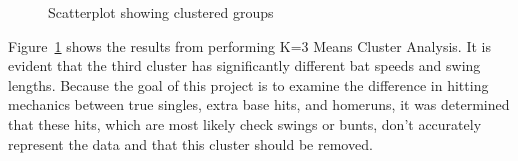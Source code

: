 \documentclass[
  letterpaper,
  DIV=11,
  numbers=noendperiod]{scrartcl}
\begin{document}
\begin{figure}[H]


\caption{\label{fig-cluster}Scatterplot showing clustered groups}

\end{figure}%

\begin{table}

\caption{\label{tbl-kmeanssum-variables}K-Means Summary Statistics}


\end{table}%

Figure~\ref{fig-cluster} shows the results from performing K=3 Means
Cluster Analysis. It is evident that the third cluster has significantly
different bat speeds and swing lengths. Because the goal of this project
is to examine the difference in hitting mechanics between true singles,
extra base hits, and homeruns, it was determined that these hits, which
are most likely check swings or bunts, don't accurately represent the
data and that this cluster should be removed.
\end{document}
